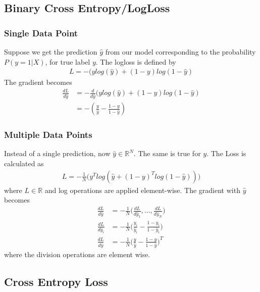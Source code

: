 \documentclass[../../deep_learning_notes.tex]{subfiles}
\begin{document}
\subsection{Binary Cross Entropy/LogLoss}
\subsubsection*{Single Data Point}
Suppose we get the prediction $\hat{y}$ from our model corresponding to the probability $P(y=1|X)$, for true label $y$. The logloss is defined by
\begin{align*}
    L = -(ylog(\hat{y}) + (1-y)log(1-\hat{y})
\end{align*}
The gradient becomes
\begin{align*}
    \frac{dL}{d\hat{y}} &= -\frac{d}{d\hat{y}} (ylog(\hat{y}) + (1-y)log(1-\hat{y})\\
    &= -(\frac{y}{\hat{y}} - \frac{1-y}{1 - \hat{y}})
\end{align*}


\subsubsection*{Multiple Data Points}
Instead of a single prediction, now $\hat{y} \in \mathbb{R}^{N}$. The same is true for $y$. The Loss is calculated as
\begin{align*}
    L = -\frac{1}{N} \big( y^{T}log(\hat{y} + (1-y)^{T}log(1-\hat{y})) \big)
\end{align*}
where $L \in \mathbb{R}$ and log operations are applied element-wise. The gradient with $\hat{y}$ becomes
\begin{align*}
    \frac{dL}{d\hat{y}} &= -\frac{1}{N}\big( \frac{dL}{d\hat{y}_{1}}, \ldots, \frac{dL}{d\hat{y}_{N}} \big)\\
    \frac{dL}{d\hat{y}_{i}} &= -\frac{1}{N} \bigg( \frac{y_{i}}{\hat{y}_{i}} - \frac{1-y_{i}}{1-\hat{y}_{i}} \bigg)\\
    \frac{dL}{d\hat{y}} &= -\frac{1}{N} \big( \frac{y}{\hat{y}} - \frac{1-y}{1-\hat{y}} \big)^{T}
\end{align*}
where the division operations are element wise.


\subsection{Cross Entropy Loss}
\end{document}
